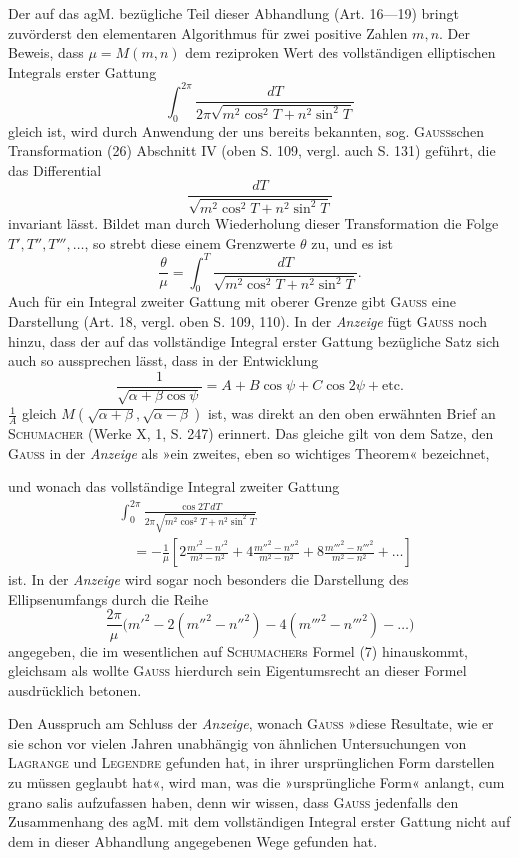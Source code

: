 Der auf das agM. bezügliche Teil dieser Abhandlung (Art. 16—19) bringt
zuvörderst den elementaren Algorithmus für zwei positive Zahlen \(m,n\). Der
Beweis, dass \(\mu=M(m,n)\) dem reziproken Wert des vollständigen elliptischen
Integrals erster Gattung
\[
\int_0^{2\pi}\frac{dT}{2\pi\sqrt{m^2\cos^2T+n^2\sin^2T}}
\]
gleich ist, wird durch Anwendung der uns bereits bekannten, sog. \textsc{Gauss}schen
Transformation (26) Abschnitt IV (oben S. 109, vergl. auch S. 131) geführt,
die das Differential
\[
\frac{dT}{\sqrt{m^2\cos^2T+n^2\sin^2T}}
\]
invariant lässt. Bildet man durch Wiederholung dieser Transformation die
Folge\linebreak \(T',T'',T''',\ldots\), so strebt diese einem Grenzwerte \(\theta\) zu, und es ist
\[
\frac\theta\mu=\int_0^T\frac{dT}{\sqrt{m^2\cos^2T+n^2\sin^2T}}.
\]
Auch für ein Integral zweiter Gattung mit  oberer Grenze gibt
\textsc{Gauss} eine Darstellung (Art. 18, vergl. oben S. 109, 110). In der \textit{Anzeige} fügt
\textsc{Gauss} noch hinzu, dass der auf das vollständige Integral erster Gattung bezügliche
Satz sich auch so aussprechen lässt, dass in der Entwicklung
\[
\frac1{\sqrt{\alpha+\beta\cos\psi}}=A+B\cos\psi+C\cos2\psi+\mathrm{etc.}
\]
\(\frac1A\) gleich \(M(\sqrt{\alpha+\beta},\sqrt{\alpha-\beta})\) ist, was direkt an den oben erwähnten Brief an
\textsc{Schumacher} (Werke X, 1, S. 247) erinnert. Das gleiche gilt von dem Satze,
den \textsc{Gauss} in der \textit{Anzeige} als »ein zweites, eben so wichtiges Theorem« bezeichnet,
\par\clearpage{}
\noindent und wonach das vollständige Integral zweiter Gattung
\[
\begin{aligned}
&\int_0^{2\pi}\frac{\cos2T\,dT}{2\pi\sqrt{m^2\cos^2T+n^2\sin^2T}}\\
&\quad=-\frac1\mu\left[2\frac{m'^2-n'^2}{m^2-n^2}
+4\frac{m''^2-n''^2}{m^2-n^2}
+8\frac{m'''^2-n'''^2}{m^2-n^2}+\ldots\right]
\end{aligned}
\]
ist. In der \textit{Anzeige} wird sogar noch besonders die Darstellung des Ellipsenumfangs
durch die Reihe
\[
\frac{2\pi}\mu\bigl(m'^2-2(m''^2-n''^2)-4(m'''^2-n'''^2)-\ldots\bigr)
\]
angegeben, die im wesentlichen auf \textsc{Schumacher}s Formel (7) hinauskommt,
gleichsam als wollte \textsc{Gauss} hierdurch sein Eigentumsrecht an dieser Formel
ausdrücklich betonen.

Den Ausspruch am Schluss der \textit{Anzeige}, wonach \textsc{Gauss} »diese Resultate,
wie er sie schon vor vielen Jahren unabhängig von ähnlichen Untersuchungen
von \textsc{Lagrange} und \textsc{Legendre} gefunden hat, in ihrer ursprünglichen Form
darstellen zu müssen geglaubt hat«, wird man, was die »ursprüngliche Form«
anlangt, cum grano salis aufzufassen haben, denn wir wissen, dass \textsc{Gauss} jedenfalls
den Zusammenhang des agM. mit dem vollständigen Integral erster Gattung
nicht auf dem in dieser Abhandlung angegebenen Wege gefunden hat.
